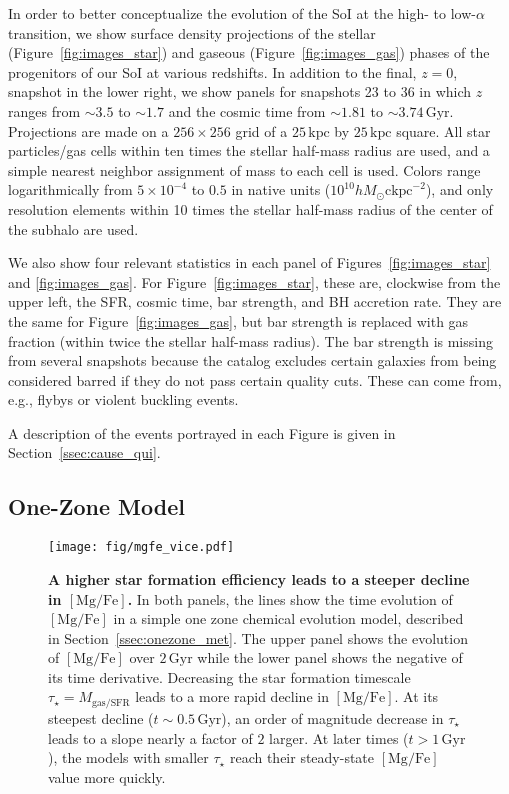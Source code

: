 \documentclass[linenumbers, twocolumn]{aastex631}
\newcommand{\Gyr}{\ensuremath{\textrm{Gyr}}}
\newcommand{\kpc}{\ensuremath{\textrm{kpc}}}
\newcommand{\ckpc}{\ensuremath{\textrm{ckpc}}}
\newcommand{\MgFe}{\ensuremath{[\textrm{Mg}/\textrm{Fe}]}}
\begin{document}
In order to better conceptualize the evolution of the SoI at the high- to low-$\alpha$ transition, we show surface density projections of the stellar (Figure~\ref{fig:images_star}) and gaseous (Figure~\ref{fig:images_gas}) phases of the progenitors of our SoI at various redshifts. In addition to the final, $z=0$, snapshot in the lower right, we show panels for snapshots 23 to 36 in which $z$ ranges from $\sim3.5$ to $\sim1.7$ and the cosmic time from $\sim1.81$ to $\sim3.74\,\Gyr$. Projections are made on a $256\times256$ grid of a $25\,\kpc$ by $25\,\kpc$ square. All star particles/gas cells within ten times the stellar half-mass radius are used, and a simple nearest neighbor assignment of mass to each cell is used. Colors range logarithmically from $5\times10^{-4}$ to $0.5$ in native units ($10^{10} h M_{\odot} \ckpc^{-2}$), and only resolution elements within 10 times the stellar half-mass radius of the center of the subhalo are used.

We also show four relevant statistics in each panel of Figures~\ref{fig:images_star} and \ref{fig:images_gas}. For Figure~\ref{fig:images_star}, these are, clockwise from the upper left, the SFR, cosmic time, bar strength, and BH accretion rate. They are the same for Figure~\ref{fig:images_gas}, but bar strength is replaced with gas fraction (within twice the stellar half-mass radius). The bar strength is missing from several snapshots because the \citet{2022MNRAS.515.1524Z} catalog excludes certain galaxies from being considered barred if they do not pass certain quality cuts. These can come from, e.g., flybys or violent buckling events.

A description of the events portrayed in each Figure is given in Section~\ref{ssec:cause_qui}.

\subsection{One-Zone Model}\label{ssec:onezone}

\begin{figure}
  \centering
  \texttt{[image: fig/mgfe\_vice.pdf]}
  \caption{\textbf{A higher star formation efficiency leads to a steeper decline in \MgFe{}.} In both panels, the lines show the time evolution of \MgFe{} in a simple one zone chemical evolution model, described in Section~\ref{ssec:onezone_met}. The upper panel shows the evolution of \MgFe{} over $2\,\Gyr$ while the lower panel shows the negative of its time derivative. Decreasing the star formation timescale $\tau_{\star}=M_{\textrm{gas}/\textrm{SFR}}$ leads to a more rapid decline in \MgFe{}. At its steepest decline ($t\sim0.5\,\Gyr$), an order of magnitude decrease in $\tau_{\star}$ leads to a slope nearly a factor of $2$ larger. At later times ($t>1\,\Gyr$), the models with smaller $\tau_{\star}$ reach their steady-state \MgFe{} value more quickly.}
  \label{fig:vice}
\end{figure}
\end{document}
